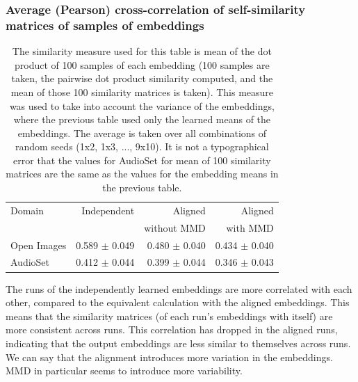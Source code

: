 \subsubsection{Average (Pearson) cross-correlation of self-similarity matrices of samples of embeddings}
\begin{table}[H]
\centering
\begin{tabular}{lrrr}
\toprule
Domain &   Independent & Aligned     &  Aligned  \\
       &               & without MMD &  with MMD \\
\midrule
Open Images    & 0.589 $\pm$ 0.049 & 0.480 $\pm$ 0.040 &     0.434 $\pm$  0.040 \\
AudioSet    & 0.412 $\pm$ 0.044 &  0.399 $\pm$ 0.044  &      0.346  $\pm$ 0.043  \\
\bottomrule
\end{tabular}
\caption{\label{table:corrsamples}The similarity measure used for this table is mean of the dot product of 100 samples of each embedding (100 samples are taken, the pairwise dot product similarity computed, and the mean of those 100 similarity matrices is taken). This measure was used to take into account the variance of the embeddings, where the previous table used only the learned means of the embeddings. The average is taken over all combinations of random seeds (1x2, 1x3, ..., 9x10). It is not a typographical error that the values for AudioSet for mean of 100 similarity matrices are the same as the values for the embedding means in the previous table. }
\end{table}

The runs of the independently learned embeddings are more correlated with each other, compared to the equivalent calculation with the aligned embeddings. This means that the similarity matrices (of each run's embeddings with itself) are more consistent across runs. This correlation has dropped in the aligned runs, indicating that the output embeddings are less similar to themselves across runs. We can say that the alignment introduces more variation in the embeddings. MMD in particular seems to introduce more variability. 

